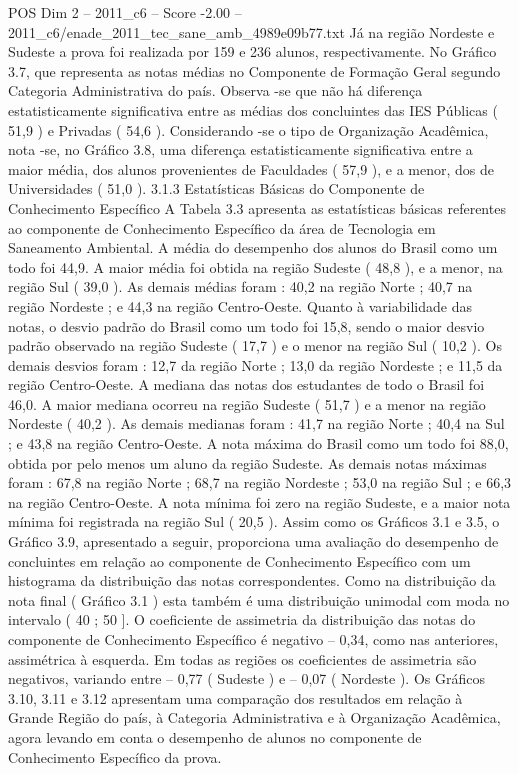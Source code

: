 \begin{textsample}{POS Dim 2 – 2011\_c6 – Score -2.00 – 2011\_c6/enade\_2011\_tec\_sane\_amb\_4989e09b77.txt}
Já na região Nordeste e Sudeste a prova foi realizada por 159 e 236 alunos, respectivamente.
No Gráfico 3.7, que representa as notas médias no Componente de Formação Geral segundo Categoria Administrativa do país.
Observa -se que não há diferença estatisticamente significativa entre as médias dos concluintes das IES Públicas ( 51,9 ) e Privadas ( 54,6 ).
Considerando -se o tipo de Organização Acadêmica, nota -se, no Gráfico 3.8, uma diferença estatisticamente significativa entre a maior média, dos alunos provenientes de Faculdades ( 57,9 ), e a menor, dos de Universidades ( 51,0 ). 3.1.3 Estatísticas Básicas do Componente de Conhecimento Específico A Tabela 3.3 apresenta as estatísticas básicas referentes ao componente de Conhecimento Específico da área de Tecnologia em Saneamento Ambiental.
A média do desempenho dos alunos do Brasil como um todo foi 44,9.
A maior média foi obtida na região Sudeste ( 48,8 ), e a menor, na região Sul ( 39,0 ).
As demais médias foram : 40,2 na região Norte ; 40,7 na região Nordeste ; e 44,3 na região Centro-Oeste.
Quanto à variabilidade das notas, o desvio padrão do Brasil como um todo foi 15,8, sendo o maior desvio padrão observado na região Sudeste ( 17,7 ) e o menor na região Sul ( 10,2 ).
Os demais desvios foram : 12,7 da região Norte ; 13,0 da região Nordeste ; e 11,5 da região Centro-Oeste.
A mediana das notas dos estudantes de todo o Brasil foi 46,0.
A maior mediana ocorreu na região Sudeste ( 51,7 ) e a menor na região Nordeste ( 40,2 ).
As demais medianas foram : 41,7 na região Norte ; 40,4 na Sul ; e 43,8 na região Centro-Oeste.
A nota máxima do Brasil como um todo foi 88,0, obtida por pelo menos um aluno da região Sudeste.
As demais notas máximas foram : 67,8 na região Norte ; 68,7 na região Nordeste ; 53,0 na região Sul ; e 66,3 na região Centro-Oeste.
A nota mínima foi zero na região Sudeste, e a maior nota mínima foi registrada na região Sul ( 20,5 ).
Assim como os Gráficos 3.1 e 3.5, o Gráfico 3.9, apresentado a seguir, proporciona uma avaliação do desempenho de concluintes em relação ao componente de Conhecimento Específico com um histograma da distribuição das notas correspondentes.
Como na distribuição da nota final ( Gráfico 3.1 ) esta também é uma distribuição unimodal com moda no intervalo ( 40 ; 50 ].
O coeficiente de assimetria da distribuição das notas do componente de Conhecimento Específico é negativo – 0,34, como nas anteriores, assimétrica à esquerda.
Em todas as regiões os coeficientes de assimetria são negativos, variando entre – 0,77 ( Sudeste ) e – 0,07 ( Nordeste ).
Os Gráficos 3.10, 3.11 e 3.12 apresentam uma comparação dos resultados em relação à Grande Região do país, à Categoria Administrativa e à Organização Acadêmica, agora levando em conta o desempenho de alunos no componente de Conhecimento Específico da prova.

\end{textsample}
